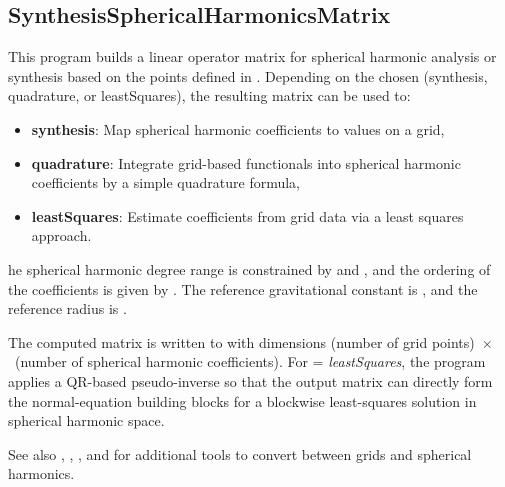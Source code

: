 \subsection{SynthesisSphericalHarmonicsMatrix}\label{SynthesisSphericalHarmonicsMatrix}
This program builds a linear operator matrix for spherical harmonic analysis or synthesis based on
the points defined in . Depending on the chosen
 (synthesis, quadrature, or leastSquares), the resulting matrix can be used to:
\begin{itemize}
  \item \textbf{synthesis}: Map spherical harmonic coefficients to values on a grid,
  \item \textbf{quadrature}: Integrate grid-based functionals into spherical harmonic coefficients by
        a simple quadrature formula,
  \item \textbf{leastSquares}: Estimate coefficients from grid data via a least squares approach.
\end{itemize}

he spherical harmonic degree range is constrained by
 and , and the ordering of the coefficients is given by
. The reference gravitational
constant is , and the reference radius is .

The computed matrix is written to  with dimensions
(number of grid points)~$\times$~(number of spherical harmonic coefficients). For
 = \emph{leastSquares}, the program applies a QR-based pseudo-inverse so that the
output matrix can directly form the normal-equation building blocks for a blockwise
least-squares solution in spherical harmonic space.

See also , ,
, and  for additional
tools to convert between grids and spherical harmonics.


